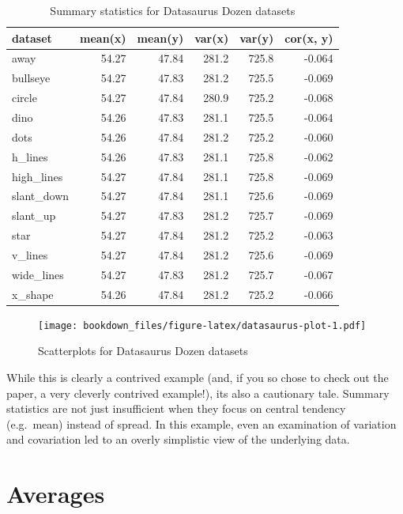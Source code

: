 \documentclass[
]{krantz}
\begin{document}
\begin{table}

\caption{\label{tab:datasaurus-tbl}Summary statistics for Datasaurus Dozen datasets}
\centering
\begin{tabular}[t]{l|r|r|r|r|r}
\hline
dataset & mean(x) & mean(y) & var(x) & var(y) & cor(x, y)\\
\hline
away & 54.27 & 47.84 & 281.2 & 725.8 & -0.064\\
\hline
bullseye & 54.27 & 47.83 & 281.2 & 725.5 & -0.069\\
\hline
circle & 54.27 & 47.84 & 280.9 & 725.2 & -0.068\\
\hline
dino & 54.26 & 47.83 & 281.1 & 725.5 & -0.064\\
\hline
dots & 54.26 & 47.84 & 281.2 & 725.2 & -0.060\\
\hline
h\_lines & 54.26 & 47.83 & 281.1 & 725.8 & -0.062\\
\hline
high\_lines & 54.27 & 47.84 & 281.1 & 725.8 & -0.069\\
\hline
slant\_down & 54.27 & 47.84 & 281.1 & 725.6 & -0.069\\
\hline
slant\_up & 54.27 & 47.83 & 281.2 & 725.7 & -0.069\\
\hline
star & 54.27 & 47.84 & 281.2 & 725.2 & -0.063\\
\hline
v\_lines & 54.27 & 47.84 & 281.2 & 725.6 & -0.069\\
\hline
wide\_lines & 54.27 & 47.83 & 281.2 & 725.7 & -0.067\\
\hline
x\_shape & 54.26 & 47.84 & 281.2 & 725.2 & -0.066\\
\hline
\end{tabular}
\end{table}

\begin{figure}
\centering
\texttt{[image: bookdown\_files/figure-latex/datasaurus-plot-1.pdf]}
\caption{\label{fig:datasaurus-plot}Scatterplots for Datasaurus Dozen datasets}
\end{figure}

While this is clearly a contrived example (and, if you so chose to check out the paper, a very cleverly contrived example!), its also a cautionary tale. Summary statistics are not just insufficient when they focus on central tendency (e.g.~mean) instead of spread. In this example, even an examination of variation and covariation led to an overly simplistic view of the underlying data.

\hypertarget{averages}{%
\section{Averages}\label{averages}}
\end{document}
